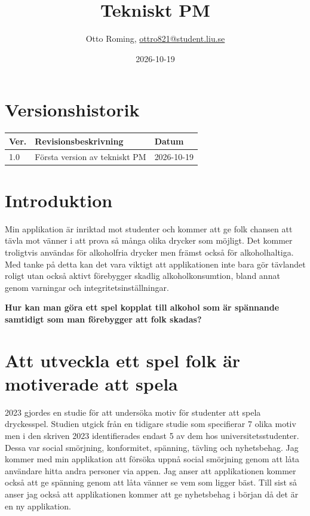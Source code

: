 \documentclass{TDP003mall}
\author{Otto Roming, \url{ottro821@student.liu.se}}
\title{Tekniskt PM}
\date{2026-10-19}
\begin{document}
\projectpage
\section{Versionshistorik}
\begin{table}[!h]
\begin{tabularx}{\linewidth}{|l|X|l|}
\hline
Ver. & Revisionsbeskrivning & Datum \\\hline
1.0 & Första version av tekniskt PM & 2026-10-19 \\\hline
\end{tabularx}
\end{table}


\section{Introduktion}
Min applikation är inriktad mot studenter och kommer att ge folk chansen att tävla mot vänner i att prova så många olika drycker som möjligt. Det kommer troligtvis användas för alkoholfria drycker men främst också för alkoholhaltiga. Med tanke på detta kan det vara viktigt att applikationen inte bara gör tävlandet roligt utan också aktivt förebygger skadlig alkoholkonsumtion, bland annat genom varningar och integritetsinställningar.

\textbf{Hur kan man göra ett spel kopplat till alkohol som är spännande samtidigt som man förebygger att folk skadas?}

\section{Att utveckla ett spel folk är motiverade att spela}
2023 gjordes en studie för att undersöka motiv för studenter att spela dryckesspel. Studien utgick från en tidigare studie som specifierar 7 olika motiv men i den skriven 2023 identifierades endast 5 av dem hos universitetsstudenter. Dessa var social smörjning, konformitet, spänning, tävling och nyhetsbehag. Jag kommer med min applikation att försöka uppnå social smörjning genom att låta användare hitta andra personer via appen. Jag anser att applikationen kommer också att ge spänning genom att låta vänner se vem som ligger bäst. Till sist så anser jag också att applikationen kommer att ge nyhetsbehag i början då det är en ny applikation. \cite{george_it_2023}
\end{document}
